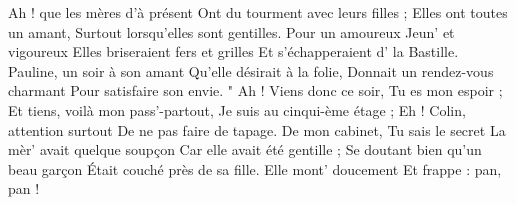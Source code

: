 \footnotemark [ititle={Mères d'à présent, Les}]

\beginverse
Ah ! que les mères d'à présent
Ont du tourment avec leurs filles ;
Elles ont toutes un amant,
Surtout lorsqu'elles sont gentilles.
Pour un amoureux
Jeun' et vigoureux
Elles briseraient fers et grilles
Et s'échapperaient d' la Bastille.
\endverse
\beginverse
Pauline, un soir à son amant
Qu'elle désirait à la folie,
Donnait un rendez-vous charmant
Pour satisfaire son envie.
" Ah ! Viens donc ce soir,
Tu es mon espoir ;
\endverse
\beginverse
Et tiens, voilà mon pass'-partout,
Je suis au cinqui-ème étage ;
Eh ! Colin, attention surtout
De ne pas faire de tapage.
De mon cabinet,
Tu sais le secret
\endverse
\beginverse
La mèr' avait quelque soupçon
Car elle avait été gentille ;
Se doutant bien qu'un beau garçon
Était couché près de sa fille.
Elle mont' doucement
Et frappe : pan, pan !
\endverse
\endsong
